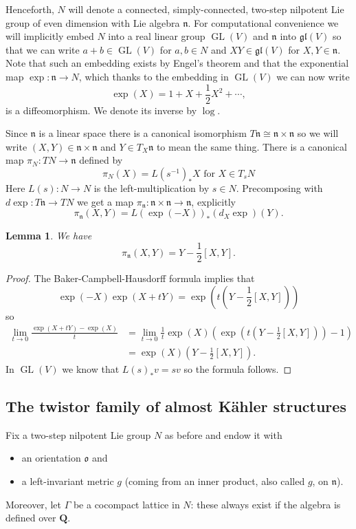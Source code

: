 \documentclass[11pt]{amsart}
\newcommand{\QQ}{\mathbf{Q}}
\newcommand{\orient}{\mathfrak{o}}
\newcommand{\nn}{\mathfrak{n}}
\newcommand{\OP}{\operatorname}
\numberwithin{equation}{section}
\newtheorem{lma}[equation]{Lemma}
\theoremstyle{definition}
\theoremstyle{remark}
\begin{document}
Henceforth, $N$ will denote a connected, simply-connected, two-step nilpotent Lie group of even dimension with Lie algebra $\nn$. For computational convenience we will implicitly embed $N$ into a real linear group $\OP{GL}(V)$ and $\nn$ into $\mathfrak{gl}(V)$ so that we can write $a+b\in\OP{GL}(V)$ for $a,b\in N$ and $XY\in\mathfrak{gl}(V)$ for $X,Y\in\nn$. Note that such an embedding exists by Engel's theorem and that the exponential map $\exp\colon\nn\to N$, which thanks to the embedding in $\OP{GL}(V)$ we can now write
\[\exp(X)=1+X+\frac{1}{2}X^2+\cdots,\]
is a diffeomorphism. We denote its inverse by $\log$.

Since $\nn$ is a linear space there is a canonical isomorphism $T\nn\cong\nn\times\nn$ so we will write $(X,Y)\in\nn\times\nn$ and $Y\in T_{X}\nn$ to mean the same thing. There is a canonical map $\pi_N\colon TN\to\nn$ defined by
\begin{equation}\label{pinbig}
\pi_N(X)=L(s^{-1})_*X\mbox{ for }X\in T_sN
\end{equation}
Here $L(s)\colon N\to N$ is the left-multiplication by $s\in N$. Precomposing with $d\exp\colon T\nn\to TN$ we get a map $\pi_{\nn}\colon\nn\times\nn\to\nn$, explicitly
\begin{equation}\label{pinlittle}\pi_{\nn}(X,Y)=L(\exp(-X))_*(d_{X}\exp)(Y).\end{equation}
\begin{lma}\label{lma:2stepform}
We have
\[\pi_{\nn}(X,Y)=Y-\frac{1}{2}[X,Y].\]
\end{lma}
\begin{proof}
The Baker-Campbell-Hausdorff formula implies that
\[\exp(-X)\exp(X+tY)=\exp\left(t\left(Y-\frac{1}{2}[X,Y]\right)\right)\]
so
\begin{align*}
\lim_{t\to 0}\frac{\exp(X+tY)-\exp(X)}{t}&=\lim_{t\to 0}\frac{1}{t}\exp(X)\left(\exp\left(t\left(Y-\frac{1}{2}[X,Y]\right)\right)-1\right)\\
&=\exp(X)\left(Y-\frac{1}{2}[X,Y]\right).
\end{align*}
In $\OP{GL}(V)$ we know that $L(s)_*v=sv$ so the formula follows.
\end{proof}


\subsection{The twistor family of almost K\"{a}hler structures}

Fix a two-step nilpotent Lie group $N$ as before and endow it with
\begin{itemize}
\item an orientation $\orient$ and
\item a left-invariant metric $g$ (coming from an inner product, also called $g$, on $\nn$).
\end{itemize}
Moreover, let $\Gamma$ be a cocompact lattice in $N$: these always exist if the algebra is defined over $\QQ$.
\end{document}
